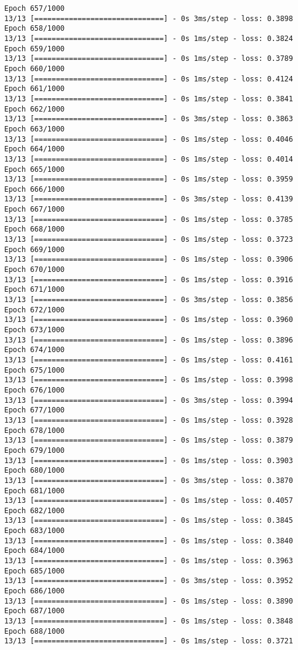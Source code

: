 \documentclass[11pt]{article}
\begin{document}
\begin{Verbatim}[commandchars=\\\{\}]
Epoch 657/1000
13/13 [==============================] - 0s 3ms/step - loss: 0.3898
Epoch 658/1000
13/13 [==============================] - 0s 1ms/step - loss: 0.3824
Epoch 659/1000
13/13 [==============================] - 0s 1ms/step - loss: 0.3789
Epoch 660/1000
13/13 [==============================] - 0s 1ms/step - loss: 0.4124
Epoch 661/1000
13/13 [==============================] - 0s 1ms/step - loss: 0.3841
Epoch 662/1000
13/13 [==============================] - 0s 3ms/step - loss: 0.3863
Epoch 663/1000
13/13 [==============================] - 0s 1ms/step - loss: 0.4046
Epoch 664/1000
13/13 [==============================] - 0s 1ms/step - loss: 0.4014
Epoch 665/1000
13/13 [==============================] - 0s 1ms/step - loss: 0.3959
Epoch 666/1000
13/13 [==============================] - 0s 3ms/step - loss: 0.4139
Epoch 667/1000
13/13 [==============================] - 0s 1ms/step - loss: 0.3785
Epoch 668/1000
13/13 [==============================] - 0s 1ms/step - loss: 0.3723
Epoch 669/1000
13/13 [==============================] - 0s 1ms/step - loss: 0.3906
Epoch 670/1000
13/13 [==============================] - 0s 1ms/step - loss: 0.3916
Epoch 671/1000
13/13 [==============================] - 0s 3ms/step - loss: 0.3856
Epoch 672/1000
13/13 [==============================] - 0s 1ms/step - loss: 0.3960
Epoch 673/1000
13/13 [==============================] - 0s 1ms/step - loss: 0.3896
Epoch 674/1000
13/13 [==============================] - 0s 1ms/step - loss: 0.4161
Epoch 675/1000
13/13 [==============================] - 0s 1ms/step - loss: 0.3998
Epoch 676/1000
13/13 [==============================] - 0s 3ms/step - loss: 0.3994
Epoch 677/1000
13/13 [==============================] - 0s 1ms/step - loss: 0.3928
Epoch 678/1000
13/13 [==============================] - 0s 1ms/step - loss: 0.3879
Epoch 679/1000
13/13 [==============================] - 0s 1ms/step - loss: 0.3903
Epoch 680/1000
13/13 [==============================] - 0s 3ms/step - loss: 0.3870
Epoch 681/1000
13/13 [==============================] - 0s 1ms/step - loss: 0.4057
Epoch 682/1000
13/13 [==============================] - 0s 1ms/step - loss: 0.3845
Epoch 683/1000
13/13 [==============================] - 0s 1ms/step - loss: 0.3840
Epoch 684/1000
13/13 [==============================] - 0s 1ms/step - loss: 0.3963
Epoch 685/1000
13/13 [==============================] - 0s 3ms/step - loss: 0.3952
Epoch 686/1000
13/13 [==============================] - 0s 1ms/step - loss: 0.3890
Epoch 687/1000
13/13 [==============================] - 0s 1ms/step - loss: 0.3848
Epoch 688/1000
13/13 [==============================] - 0s 1ms/step - loss: 0.3721

\end{Verbatim}
\end{document}
